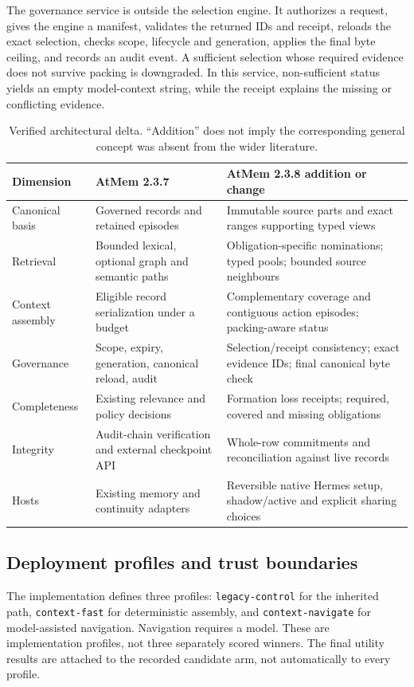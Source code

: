 \documentclass[11pt]{article}
\newcommand{\code}[1]{\texttt{\small #1}}
\begin{document}
The governance service is outside the selection engine. It authorizes a request, gives the engine a manifest, validates the returned IDs and receipt, reloads the exact selection, checks scope, lifecycle and generation, applies the final byte ceiling, and records an audit event. A sufficient selection whose required evidence does not survive packing is downgraded. In this service, non-sufficient status yields an empty model-context string, while the receipt explains the missing or conflicting evidence.

\begin{table}[t]
\centering\small
\begin{tabularx}{\linewidth}{p{.17\linewidth}YY}
\toprule
Dimension & AtMem 2.3.7 & AtMem 2.3.8 addition or change\\\midrule
Canonical basis & Governed records and retained episodes & Immutable source parts and exact ranges supporting typed views\\
Retrieval & Bounded lexical, optional graph and semantic paths & Obligation-specific nominations; typed pools; bounded source neighbours\\
Context assembly & Eligible record serialization under a budget & Complementary coverage and contiguous action episodes; packing-aware status\\
Governance & Scope, expiry, generation, canonical reload, audit & Selection/receipt consistency; exact evidence IDs; final canonical byte check\\
Completeness & Existing relevance and policy decisions & Formation loss receipts; required, covered and missing obligations\\
Integrity & Audit-chain verification and external checkpoint API & Whole-row commitments and reconciliation against live records\\
Hosts & Existing memory and continuity adapters & Reversible native Hermes setup, shadow/active and explicit sharing choices\\\bottomrule
\end{tabularx}
\caption{Verified architectural delta. ``Addition'' does not imply the corresponding general concept was absent from the wider literature.}
\label{tab:delta}
\end{table}

\subsection{Deployment profiles and trust boundaries}
The implementation defines three profiles: \code{legacy-control} for the inherited path, \code{context-fast} for deterministic assembly, and \code{context-navigate} for model-assisted navigation. Navigation requires a model. These are implementation profiles, not three separately scored winners. The final utility results are attached to the recorded candidate arm, not automatically to every profile.
\end{document}

